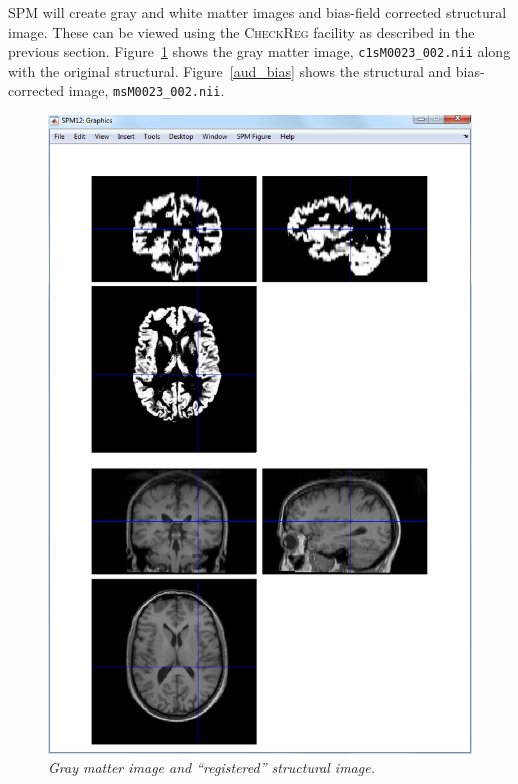 SPM will create gray and white matter images and bias-field corrected structural image. These can be viewed using the \textsc{CheckReg} facility as described in the previous section. Figure~\ref{aud_gray} shows the gray matter image, \texttt{c1sM0023\_002.nii} along with the original structural. Figure~\ref{aud_bias} shows the structural and bias-corrected image, \texttt{msM0023\_002.nii}.

\begin{figure}
\begin{center}
\includegraphics[width=125mm]{auditory/gray}
\caption{\em Gray matter image and ``registered'' structural image.\label{aud_gray}}
\end{center}
\end{figure}

